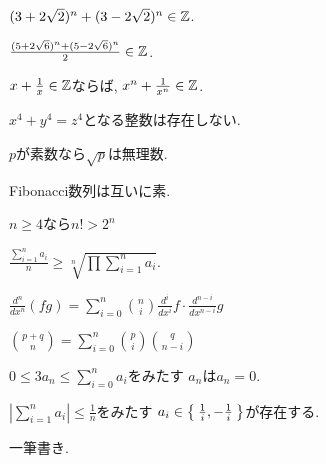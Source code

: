 \begin{prop}
  $(3+2\sqrt{2})^n+(3-2\sqrt{2})^n\in\mathbb{Z}$.
\end{prop}

\begin{prop}
  $\frac{(5+2\sqrt{6})^n+(5-2\sqrt{6})^n}{2}\in\mathbb{Z}$.
\end{prop}

\begin{prop}
  $x+\frac{1}{x}\in\mathbb{Z}$ならば, 
  $x^n+\frac{1}{x^n}\in\mathbb{Z}$.
\end{prop}


\begin{prop}
  $x^4+y^4=z^4$となる整数は存在しない.
\end{prop}

\begin{prop}
  $p$が素数なら$\sqrt{p}$は無理数.
\end{prop}

\begin{prop}
  Fibonacci数列は互いに素.
\end{prop}



\begin{prop}
  $n\geq 4$なら$n!>2^n$
\end{prop}



\begin{prop}
  $\frac{\sum_{i=1}^n a_i}{n} \geq \sqrt[n]{\prod\sum_{i=1}^n a_i}$.
\end{prop}


\begin{prop}
$\frac{d^n}{dx^n}(fg)=\sum_{i=0}^n\binom{n}{i}\frac{d^i}{dx^i}f \cdot \frac{d^{n-i}}{dx^{n-i}}g$
\end{prop}


\begin{prop}
$\binom{p+q}{n}=\sum_{i=0}^n\binom{p}{i}\binom{q}{n-i}$
\end{prop}


\begin{prop}
  $0\leq 3a_n\leq\sum_{i=0}^n a_i$をみたす
  $a_n$は$a_n=0$.
\end{prop}

\begin{prop}
  $|\sum_{i=1}^{n}a_i|\leq \frac{1}{n}$をみたす
  $a_i\in\Set{\frac{1}{i},-\frac{1}{i}}$が存在する.
\end{prop}

\begin{prop}
一筆書き.
\end{prop}

